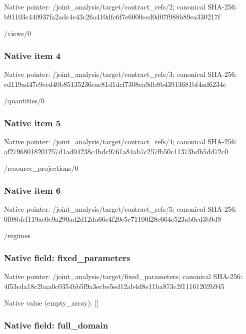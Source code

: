 \documentclass[10pt,a4paper]{article}
\begin{document}
Native pointer: /joint\_analysis/target/contract\_refs/2; canonical SHA-256: b91103c440937fa2adc4e43c\allowbreak{}26a410dfc6f7e6000ced0d07\allowbreak{}f988b89ea330217f


/views/0


\subsubsection{Native item 4}


Native pointer: /joint\_analysis/target/contract\_refs/3; canonical SHA-256: cd119ad47e9ced40b8513523\allowbreak{}6eae81d1dcf7308ea9db8b43\allowbreak{}913681bf4ad6234c


/quantities/0


\subsubsection{Native item 5}


Native pointer: /joint\_analysis/target/contract\_refs/4; canonical SHA-256: af27968018201257d1ad0423\allowbreak{}8c4bdc9761a84ab7c257fb50\allowbreak{}c11373bdb5dd72c0


/resource\_projections/0


\subsubsection{Native item 6}


Native pointer: /joint\_analysis/target/contract\_refs/5; canonical SHA-256: 0f08bfcf119ae0e9a290ad2d\allowbreak{}12da66c4f20c5c71100f28c6\allowbreak{}64e523ab0cd3b9d9


/regimes


\subsubsection{Native field: fixed\_parameters}


Native pointer: /joint\_analysis/target/fixed\_parameters; canonical SHA-256: 4f53cda18c2baa0c0354bb5f\allowbreak{}9a3ecbe5ed12ab4d8e11ba87\allowbreak{}3c2f11161202b945



Native value (empty\_array): []



\subsubsection{Native field: full\_domain}
\end{document}
